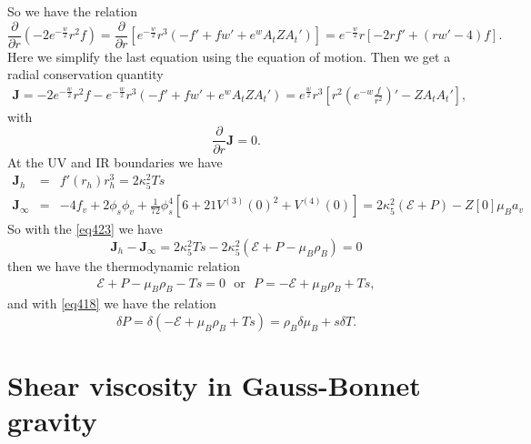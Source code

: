 \documentclass[a4paper,12pt]{article}
\numberwithin{equation}{section}
\begin{document}
So we have the relation
\begin{equation}
    \frac{\partial}{\partial r}\left(-2 e^{-\frac{w}{2}}r^2f\right)=\frac{\partial}{\partial r}\left[e^{-\frac{w}{2}}r^3 \left(-f'+fw' +e^w A_t Z A_t'\right)\right]=e^{-\frac{w}{2}}r\left[-2rf'+\left(rw'-4\right)f \right].
\end{equation}
Here we simplify the last equation using the equation of motion. Then we get a radial conservation quantity
\begin{eqnarray}
    \mathbf{J}=-2 e^{-\frac{w}{2}}r^2f-e^{-\frac{w}{2}}r^3 \left(-f'+fw' +e^w A_t Z A_t'\right)=e^{\frac{w}{2}}r^3\left[r^2\left(e^{-w}\frac{f}{r^2}\right)' -ZA_tA_t'\right],
\end{eqnarray}
with 
\begin{equation} \label{eq423}
    \frac{\partial}{\partial r}\mathbf{J}=0.
\end{equation}
At the UV and IR boundaries we have
\begin{eqnarray}
    \mathbf{J}_{h}&=&f'(r_h)r_h^3 =2\kappa_5^2 Ts\\
    \mathbf{J}_{\infty}&=& -4f_v+2\phi_s\phi_v+\frac{1}{72}\phi_s^4\left[6+21V^{(3)}(0)^2+V^{(4)}(0)\right]=2\kappa_5^2\left(\mathcal{E}+P\right)-Z[0]\mu_B a_v
\end{eqnarray}
So with the \ref{eq423} we have
\begin{equation}
    \mathbf{J}_{h}-\mathbf{J}_{\infty}=2\kappa_5^2 Ts-2\kappa_5^2  \left(\mathcal{E}+P-\mu_B \rho_B\right)=0
\end{equation}
then we have the thermodynamic relation 
\begin{eqnarray}
    \mathcal{E}+P-\mu_B \rho_B-Ts=0~~~\text{or}~~~P=-\mathcal{E}+\mu_B \rho_B+Ts,
\end{eqnarray}
and with \ref{eq418} we have the relation
\begin{equation}
    \delta P=\delta\left( \mathcal{-E}+\mu_B \rho_B+Ts\right)=\rho_B\delta\mu_B+s\delta T.
\end{equation}

\section{Shear viscosity in Gauss-Bonnet gravity}\label{sec:04}
\end{document}
